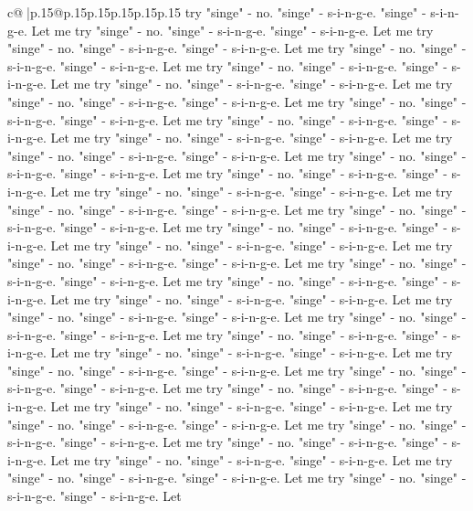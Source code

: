 \documentclass{article}
\begin{document}
{\begin{supertabular}{c@{$\;$}|p{.15\linewidth}@{}p{.15\linewidth}p{.15\linewidth}p{.15\linewidth}p{.15\linewidth}p{.15\linewidth}}
{{{try "singe" {-} no. "singe" {-} s{-}i{-}n{-}g{-}e. "singe" {-} s{-}i{-}n{-}g{-}e. Let me try "singe" {-} no. "singe" {-} s{-}i{-}n{-}g{-}e. "singe" {-} s{-}i{-}n{-}g{-}e. Let me try "singe" {-} no. "singe" {-} s{-}i{-}n{-}g{-}e. "singe" {-} s{-}i{-}n{-}g{-}e. Let me try "singe" {-} no. "singe" {-} s{-}i{-}n{-}g{-}e. "singe" {-} s{-}i{-}n{-}g{-}e. Let me try "singe" {-} no. "singe" {-} s{-}i{-}n{-}g{-}e. "singe" {-} s{-}i{-}n{-}g{-}e. Let me try "singe" {-} no. "singe" {-} s{-}i{-}n{-}g{-}e. "singe" {-} s{-}i{-}n{-}g{-}e. Let me try "singe" {-} no. "singe" {-} s{-}i{-}n{-}g{-}e. "singe" {-} s{-}i{-}n{-}g{-}e. Let me try "singe" {-} no. "singe" {-} s{-}i{-}n{-}g{-}e. "singe" {-} s{-}i{-}n{-}g{-}e. Let me try "singe" {-} no. "singe" {-} s{-}i{-}n{-}g{-}e. "singe" {-} s{-}i{-}n{-}g{-}e. Let me try "singe" {-} no. "singe" {-} s{-}i{-}n{-}g{-}e. "singe" {-} s{-}i{-}n{-}g{-}e. Let me try "singe" {-} no. "singe" {-} s{-}i{-}n{-}g{-}e. "singe" {-} s{-}i{-}n{-}g{-}e. Let me try "singe" {-} no. "singe" {-} s{-}i{-}n{-}g{-}e. "singe" {-} s{-}i{-}n{-}g{-}e. Let me try "singe" {-} no. "singe" {-} s{-}i{-}n{-}g{-}e. "singe" {-} s{-}i{-}n{-}g{-}e. Let me try "singe" {-} no. "singe" {-} s{-}i{-}n{-}g{-}e. "singe" {-} s{-}i{-}n{-}g{-}e. Let me try "singe" {-} no. "singe" {-} s{-}i{-}n{-}g{-}e. "singe" {-} s{-}i{-}n{-}g{-}e. Let me try "singe" {-} no. "singe" {-} s{-}i{-}n{-}g{-}e. "singe" {-} s{-}i{-}n{-}g{-}e. Let me try "singe" {-} no. "singe" {-} s{-}i{-}n{-}g{-}e. "singe" {-} s{-}i{-}n{-}g{-}e. Let me try "singe" {-} no. "singe" {-} s{-}i{-}n{-}g{-}e. "singe" {-} s{-}i{-}n{-}g{-}e. Let me try "singe" {-} no. "singe" {-} s{-}i{-}n{-}g{-}e. "singe" {-} s{-}i{-}n{-}g{-}e. Let me try "singe" {-} no. "singe" {-} s{-}i{-}n{-}g{-}e. "singe" {-} s{-}i{-}n{-}g{-}e. Let me try "singe" {-} no. "singe" {-} s{-}i{-}n{-}g{-}e. "singe" {-} s{-}i{-}n{-}g{-}e. Let me try "singe" {-} no. "singe" {-} s{-}i{-}n{-}g{-}e. "singe" {-} s{-}i{-}n{-}g{-}e. Let me try "singe" {-} no. "singe" {-} s{-}i{-}n{-}g{-}e. "singe" {-} s{-}i{-}n{-}g{-}e. Let me try "singe" {-} no. "singe" {-} s{-}i{-}n{-}g{-}e. "singe" {-} s{-}i{-}n{-}g{-}e. Let me try "singe" {-} no. "singe" {-} s{-}i{-}n{-}g{-}e. "singe" {-} s{-}i{-}n{-}g{-}e. Let me try "singe" {-} no. "singe" {-} s{-}i{-}n{-}g{-}e. "singe" {-} s{-}i{-}n{-}g{-}e. Let me try "singe" {-} no. "singe" {-} s{-}i{-}n{-}g{-}e. "singe" {-} s{-}i{-}n{-}g{-}e. Let me try "singe" {-} no. "singe" {-} s{-}i{-}n{-}g{-}e. "singe" {-} s{-}i{-}n{-}g{-}e. Let me try "singe" {-} no. "singe" {-} s{-}i{-}n{-}g{-}e. "singe" {-} s{-}i{-}n{-}g{-}e. Let me try "singe" {-} no. "singe" {-} s{-}i{-}n{-}g{-}e. "singe" {-} s{-}i{-}n{-}g{-}e. Let me try "singe" {-} no. "singe" {-} s{-}i{-}n{-}g{-}e. "singe" {-} s{-}i{-}n{-}g{-}e. Let me try "singe" {-} no. "singe" {-} s{-}i{-}n{-}g{-}e. "singe" {-} s{-}i{-}n{-}g{-}e. Let me try "singe" {-} no. "singe" {-} s{-}i{-}n{-}g{-}e. "singe" {-} s{-}i{-}n{-}g{-}e. Let me try "singe" {-} no. "singe" {-} s{-}i{-}n{-}g{-}e. "singe" {-} s{-}i{-}n{-}g{-}e. Let me try "singe" {-} no. "singe" {-} s{-}i{-}n{-}g{-}e. "singe" {-} s{-}i{-}n{-}g{-}e. Let me try "singe" {-} no. "singe" {-} s{-}i{-}n{-}g{-}e. "singe" {-} s{-}i{-}n{-}g{-}e. Let }}}
\end{supertabular}}
\end{document}

